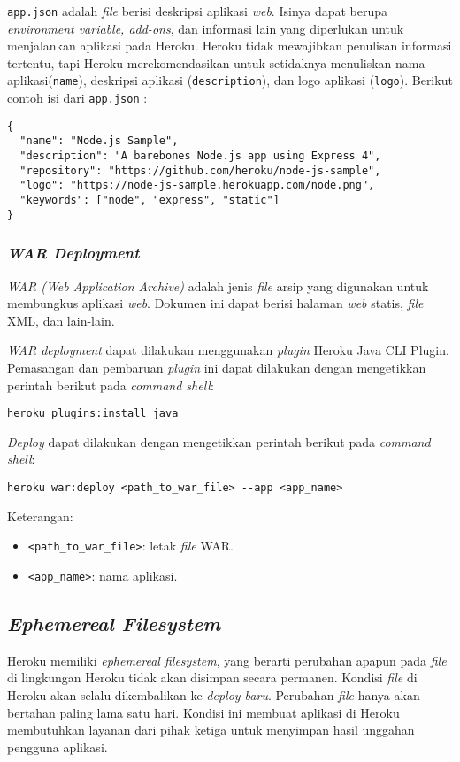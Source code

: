 \texttt{app.json} adalah \textit{file} berisi deskripsi aplikasi \textit{web}. Isinya dapat berupa \textit{environment variable, add-ons}, dan informasi lain yang diperlukan untuk menjalankan aplikasi pada Heroku. Heroku tidak mewajibkan penulisan informasi tertentu, tapi Heroku merekomendasikan untuk setidaknya menuliskan nama aplikasi(\texttt{name}), deskripsi aplikasi (\texttt{description}), dan logo aplikasi (\texttt{logo}). Berikut contoh isi dari \texttt{app.json} :
\begin{lstlisting}
{
  "name": "Node.js Sample",
  "description": "A barebones Node.js app using Express 4",
  "repository": "https://github.com/heroku/node-js-sample",
  "logo": "https://node-js-sample.herokuapp.com/node.png",
  "keywords": ["node", "express", "static"]
}
\end{lstlisting}

\subsubsection{\textit{WAR Deployment}}
\textit{WAR (Web Application Archive)} adalah jenis \textit{file} arsip yang digunakan untuk membungkus aplikasi \textit{web}. Dokumen ini dapat berisi halaman \textit{web} statis, \textit{file} XML, dan lain-lain. \cite{etzkorn2017introduction}

\textit{WAR deployment} dapat dilakukan menggunakan \textit{plugin} Heroku Java CLI Plugin. Pemasangan dan pembaruan \textit{plugin} ini dapat dilakukan dengan mengetikkan perintah berikut pada \textit{command shell}:
\begin{lstlisting}
heroku plugins:install java
\end{lstlisting}

\textit{Deploy} dapat dilakukan dengan mengetikkan perintah berikut pada \textit{command shell}:
\begin{lstlisting}
heroku war:deploy <path_to_war_file> --app <app_name>
\end{lstlisting}
Keterangan:
\begin{itemize}
\item \texttt{<path\_to\_war\_file>}: letak \textit{file} WAR.
\item \texttt{<app\_name>}: nama aplikasi.
\end{itemize}

\subsection{\textit{Ephemereal Filesystem}}
Heroku memiliki \textit{ephemereal filesystem}, yang berarti perubahan apapun pada \textit{file} di lingkungan Heroku tidak akan disimpan secara permanen. Kondisi \textit{file} di Heroku akan selalu dikembalikan ke \textit{deploy baru}. Perubahan \textit{file} hanya akan bertahan paling lama satu hari. Kondisi ini membuat aplikasi di Heroku membutuhkan layanan dari pihak ketiga untuk menyimpan hasil unggahan pengguna aplikasi.

